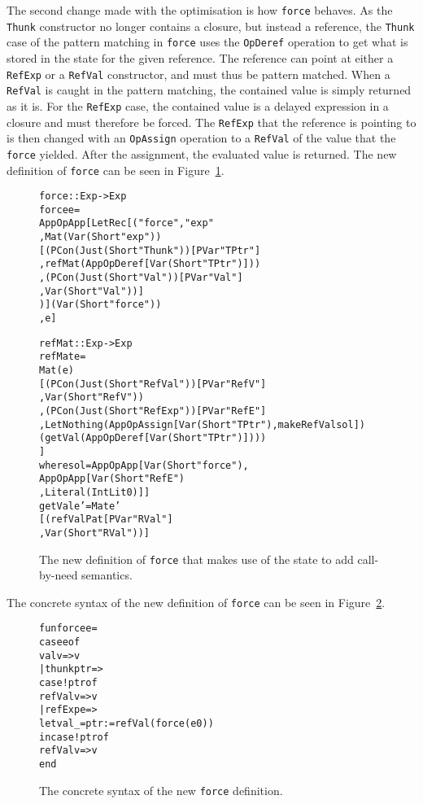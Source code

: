 The second change made with the optimisation is how \texttt{force}
behaves. As the \texttt{Thunk} constructor no longer contains a closure, but
instead a reference, the \texttt{Thunk} case of the pattern matching in
\texttt{force} uses the \texttt{OpDeref} operation to get what is stored in
the state for the given reference. The reference can point at either a
\texttt{RefExp} or a \texttt{RefVal} constructor, and must thus be pattern
matched. When a \texttt{RefVal} is caught in the pattern matching, the contained
value is simply returned as it is. For the \texttt{RefExp} case, the contained
value is a delayed expression in a closure and must therefore be forced.
The \texttt{RefExp} that the reference is pointing to is then changed with an
\texttt{OpAssign} operation to a \texttt{RefVal} of the value that the
\texttt{force} yielded. After the assignment, the evaluated value is returned.
The new definition of \texttt{force} can be seen in Figure~\ref{fig:force2abstract}.
\begin{figure}
\begin{alltt}
  force :: Exp -> Exp
  force e =
    App OpApp [LetRec [("force", "exp"
                       , Mat (Var (Short "exp"))
                         [(PCon (Just (Short "Thunk")) [PVar "TPtr"]
                          ,refMat (App OpDeref [Var (Short "TPtr")]))
                         ,(PCon (Just (Short "Val")) [PVar "Val"]
                          , Var (Short "Val"))]
                       )] (Var (Short "force"))
              , e]

  refMat :: Exp -> Exp
  refMat e =
    Mat (e)
    [(PCon (Just (Short "RefVal")) [PVar "RefV"]
     ,Var (Short "RefV"))
    ,(PCon (Just (Short "RefExp")) [PVar "RefE"]
     ,Let Nothing (App OpAssign [Var (Short "TPtr"), makeRefVal sol])
       (getVal (App OpDeref [Var (Short "TPtr")])))
    ]
    where sol = App OpApp [Var (Short "force"),
                           App OpApp [Var (Short "RefE")
                                     ,Literal (IntLit 0)]]
          getVal e' = Mat e'
                      [(refValPat [PVar "RVal"]
                       ,Var (Short "RVal"))]
\end{alltt}
\caption{The new definition of \texttt{force} that makes use of the state to add call-by-need semantics.}
\label{fig:force2abstract}
\end{figure}
The concrete syntax of the new definition of \texttt{force} can be seen in
Figure~\ref{fig:force2Concrete}.
\begin{figure}
\begin{alltt}
  fun force e =
    case e of
      val v => v
    | thunk ptr =>
        case !ptr of
          refVal v => v
        | refExp e =>
            let val _ = ptr := refVal (force (e 0))
            in case !ptr of
                 refVal v => v
            end
\end{alltt}
\caption{The concrete syntax of the new \texttt{force} definition.}
\label{fig:force2Concrete}
\end{figure}

